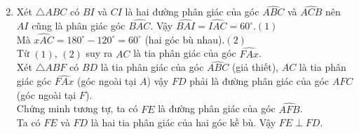 \begin{vd}
{		\begin{enumerate}
			\setcounter{enumi}{1}
			\item Xét $\triangle ABC$ có $BI$ và $CI$ là hai đường phân giác của góc $\widehat{ABC}$ và $\widehat{ACB}$ nên $AI$ cũng là phân giác góc $\widehat{BAC}$. Vậy $\widehat{BAI}=\widehat{IAC}=60^\circ$.\hfill$(1)$\\
			Mà $\widehat{xAC}=180^\circ -120^\circ=60^\circ$ (hai góc bù nhau).\hfill$(2)$\\
			Từ $(1)$, $(2)$ suy ra $AC$ là tia phân giác của góc $\widehat{FAx}$.\\
			Xét $\triangle ABF$ có $BD$ là tia phân giác của góc $\widehat{ABC}$ (giả thiết), $AC$ là tia phân giác góc $\widehat{FAx}$ (góc ngoài tại $A$) vậy $FD$ phải là đường phân giác của góc $AFC$ (góc ngoài tại $F$).\\
			Chứng minh tương tự, ta có $FE$ là đường phân giác của góc $\widehat{AFB}$.\\
			Ta có $FE$ và $FD$ là hai tia phân giác của hai góc kề bù. Vậy $FE\perp FD$.
		\end{enumerate}
	}
\end{vd}

